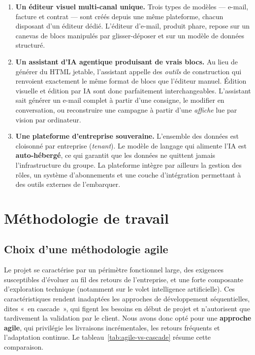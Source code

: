 \documentclass[12pt,a4paper,oneside]{report}
\begin{document}
\begin{enumerate}[leftmargin=1.4cm]
  \item \textbf{Un éditeur visuel multi-canal unique.} Trois types de
  modèles — e-mail, facture et contrat — sont créés depuis une
  même plateforme, chacun disposant d'un éditeur dédié. L'éditeur d'e-mail,
  produit phare, repose sur un canevas de blocs manipulés par
  glisser-déposer et sur un modèle de données structuré.

  \item \textbf{Un assistant d'IA agentique produisant de vrais blocs.} Au
  lieu de générer du HTML jetable, l'assistant appelle des \emph{outils} de
  construction qui renvoient exactement le même format de blocs que
  l'éditeur manuel. Édition visuelle et édition par IA sont donc
  parfaitement interchangeables. L'assistant sait générer un e-mail complet
  à partir d'une consigne, le modifier en conversation, ou reconstruire une
  campagne à partir d'une \emph{affiche} lue par vision par ordinateur.

  \item \textbf{Une plateforme d'entreprise souveraine.} L'ensemble des
  données est cloisonné par entreprise (\emph{tenant}). Le modèle de langage
  qui alimente l'IA est \textbf{auto-hébergé}, ce qui garantit que les
  données ne quittent jamais l'infrastructure du groupe. La plateforme
  intègre par ailleurs la gestion des rôles, un système d'abonnements et
  une couche d'intégration permettant à des outils externes de l'embarquer.
\end{enumerate}

\section{Méthodologie de travail}

\subsection{Choix d'une méthodologie agile}
Le projet se caractérise par un périmètre fonctionnel large, des exigences
susceptibles d'évoluer au fil des retours de l'entreprise, et une forte
composante d'exploration technique (notamment sur le volet intelligence
artificielle). Ces caractéristiques rendent inadaptées les approches de
développement séquentielles, dites «~en cascade~», qui figent les besoins
en début de projet et n'autorisent que tardivement la validation par le
client. Nous avons donc opté pour une \textbf{approche agile}, qui privilégie
les livraisons incrémentales, les retours fréquents et l'adaptation
continue. Le tableau~\ref{tab:agile-vs-cascade} résume cette comparaison.
\end{document}
